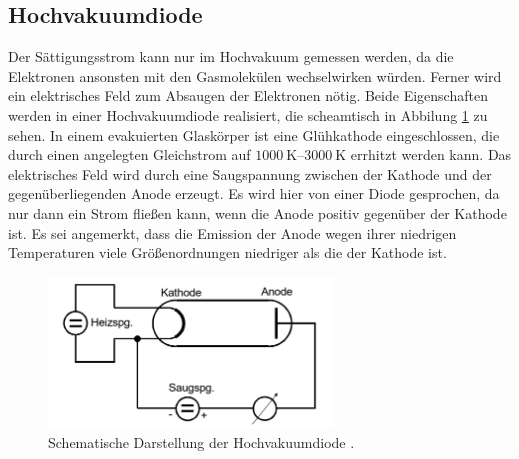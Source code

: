 \subsection{Hochvakuumdiode}
Der Sättigungsstrom kann nur im Hochvakuum gemessen werden, da die Elektronen ansonsten mit den Gasmolekülen wechselwirken würden.
Ferner wird ein elektrisches Feld zum Absaugen der Elektronen nötig.
Beide Eigenschaften werden in einer Hochvakuumdiode realisiert, die scheamtisch in Abbilung \ref{fig:hochvakuumdiode} zu sehen.
In einem evakuierten Glaskörper ist eine Glühkathode eingeschlossen, 
die durch einen angelegten Gleichstrom auf $\qtyrange[]{1000}{3000}{\kelvin}$ errhitzt werden kann.
Das elektrisches Feld wird durch eine Saugspannung zwischen der Kathode und der gegenüberliegenden Anode erzeugt.
Es wird hier von einer Diode gesprochen, da nur dann ein Strom fließen kann, wenn die Anode positiv gegenüber der Kathode ist.
Es sei angemerkt, dass die Emission der Anode wegen ihrer niedrigen Temperaturen viele Größenordnungen niedriger als die der Kathode ist.

\begin{figure}[H]
    \centering
    \includegraphics[height = 4cm]{Abbildungen/hochvakuum_diode.png}
    \caption[]{Schematische Darstellung der Hochvakuumdiode \cite{man:v504}.}
    \label{fig:hochvakuumdiode}
\end{figure}



